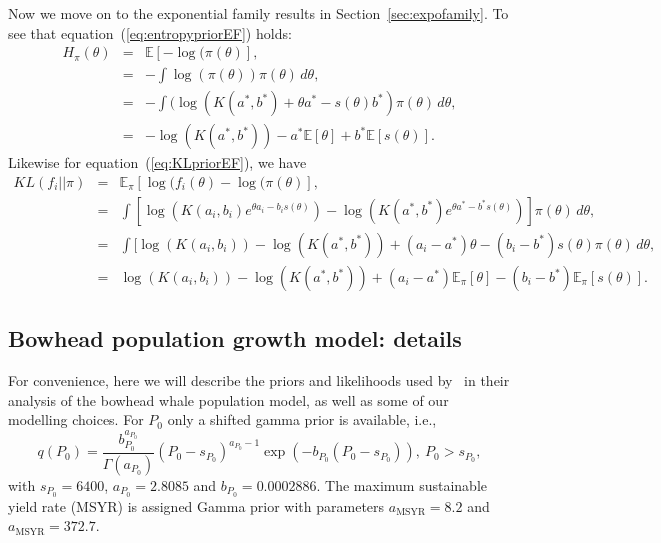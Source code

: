 \documentclass[a4paper, notitlepage, 10pt]{article}
\begin{document}
Now we move on to the exponential family results in Section~\ref{sec:expofamily}.
To see that equation~(\ref{eq:entropypriorEF}) holds:
\begin{eqnarray*} 
H_\pi(\theta) & = & \mathbb{E}[-\log(\pi(\theta)], \\
              & = & - \int \log(\pi(\theta)) \pi(\theta) \, d\theta, \\
              & = & - \int (\log(K(a^*, b^*) + \theta a^* - s(\theta) b^*) \pi(\theta) \, d\theta, \\
              & = & - \log(K(a^*, b^*)) - a^*  \mathbb{E}[\theta] +  b^*  \mathbb{E}[s(\theta)].
\end{eqnarray*}
Likewise for equation~(\ref{eq:KLpriorEF}), we have 
\begin{eqnarray*} 
KL(f_i || \pi) & = & \mathbb{E}_\pi[\log(f_i(\theta)-\log(\pi(\theta)], \\
              & = & \int [\log( K(a_i,b_i) e^{\theta a_i - b_i s(\theta)}) - \log(K(a^*,b^*) e^{\theta a^* - b^* s(\theta)}) ] \pi(\theta) \, d\theta, \\
              & = & \int [\log( K(a_i,b_i)) - \log(K(a^*,b^*)) + (a_i - a^*) \theta  - (b_i - b^*) s(\theta) \pi(\theta) \, d\theta, \\
              & = & \log( K(a_i,b_i)) - \log(K(a^*,b^*)) + (a_i - a^*) \mathbb{E}_\pi[\theta] - (b_i - b^*) \mathbb{E}_\pi[s(\theta)]. 
\end{eqnarray*}

\newpage
\subsection{Bowhead population growth model: details}

For convenience, here we will describe the priors and likelihoods used by~\cite{Poole2000} in their analysis of the bowhead whale population model, as well as some of our modelling choices.
For $P_0$ only a shifted gamma prior is available, i.e.,
\begin{equation*}
 q(P_0) = \frac{b_{P_0}^{a_{P_0}}}{\Gamma(a_{P_0})} (P_0 - s_{P_0})^{a_{P_0}-1} \exp\left(-b_{P_0}(P_0 - s_{P_0})\right), \: P_0 > s_{P_0},
\end{equation*}
with $s_{P_0} = 6400$, $a_{P_0} = 2.8085$ and $b_{P_0} = 0.0002886$.
The maximum sustainable yield rate (MSYR) is assigned Gamma prior with parameters $a_{\text{MSYR}} = 8.2$ and $a_{\text{MSYR}} = 372.7$.
\end{document}
